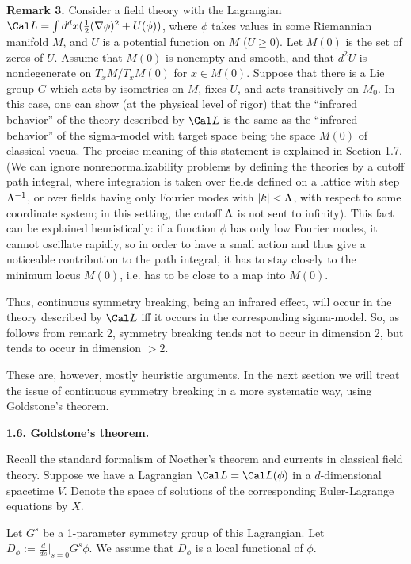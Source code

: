 {\bf Remark 3.} Consider a field theory with the Lagrangian
$\Cal L=
\int d^dx(\frac{1}{2}(\nabla\phi)^2+U(\phi))$, where $\phi$ takes values in 
some Riemannian manifold $M$, 
and $U$ is a potential function on $M$ ($U\ge 0$). 
Let $M(0)$ is the set of zeros of $U$. Assume that $M(0)$ is nonempty
and smooth, and that $d^2U$ is nondegenerate on $T_xM/T_xM(0)$ for 
$x\in M(0)$. Suppose that there is 
a Lie group $G$ which acts by isometries on $M$, 
fixes $U$, and acts transitively on $M_0$.
In this case, one can show 
(at the physical level of rigor)
that the ``infrared behavior''
of the theory described by $\Cal L$ is the same as the ``infrared behavior''
of the sigma-model with target space being the space $M(0)$ of classical 
vacua. The precise meaning of this statement is explained in Section 1.7. 
(We can ignore nonrenormalizability problems by defining the theories 
by a cutoff path integral, where integration is taken over fields 
defined on a lattice with step $\Lambda^{-1}$, or over fields 
having only Fourier modes with $|k|<\Lambda$, with respect to some 
coordinate system; in this setting, the cutoff $\Lambda$ is not sent to infinity).
 This fact can be explained heuristically: if 
a function $\phi$ has only low Fourier modes, it cannot oscillate 
rapidly, so in order to have a small action and thus give a 
noticeable contribution to the path integral, it has to stay closely 
to the minimum locus $M(0)$, i.e. has to be close to a map into $M(0)$. 

Thus, continuous symmetry breaking, being an infrared effect, will occur in 
the theory described by $\Cal L$ iff it occurs in 
the corresponding sigma-model. So, as follows from remark 2, 
symmetry breaking tends not to occur in dimension 2, but tends to occur
in dimension $>2$. 

These are, however, mostly heuristic arguments. 
In the next section we will treat the issue of continuous 
symmetry breaking in a more systematic way, using Goldstone's theorem. 

{\bf 1.6. Goldstone's theorem.}

Recall the standard formalism of Noether's theorem and currents 
in classical field theory. Suppose we have a Lagrangian 
$\Cal L=\Cal L(\phi)$ in a $d$-dimensional spacetime $V$.
Denote the space of solutions of the corresponding Euler-Lagrange 
equations by $X$. 

Let  $G^s$ be a 1-parameter symmetry group 
of this Lagrangian. Let $D_\phi:=\frac{d}{ds}|_{s=0}G^s\phi$. 
We assume that $D_\phi$ is a local functional of $\phi$. 
 
